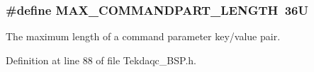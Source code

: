 \hypertarget{group__command__parser_ga6147771b5547853f33eb838895e3d5a2}{
\subsubsection[{M\-A\-X\-\_\-\-C\-O\-M\-M\-A\-N\-D\-P\-A\-R\-T\-\_\-\-L\-E\-N\-G\-T\-H}]{\setlength{\rightskip}{0pt plus 5cm}\#define M\-A\-X\-\_\-\-C\-O\-M\-M\-A\-N\-D\-P\-A\-R\-T\-\_\-\-L\-E\-N\-G\-T\-H~36\-U}}\label{group__command__parser_ga6147771b5547853f33eb838895e3d5a2}
The maximum length of a command parameter key/value pair. 

Definition at line 88 of file Tekdaqc\-\_\-\-B\-S\-P.\-h.

